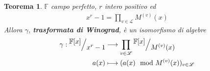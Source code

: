 \documentclass[mathserif]{beamer}
\def\quotient#1#2{%
   \raise1ex\hbox{$#1$}\Big/\lower1ex\hbox{$#2$}%
}
\newtheorem{teorema}{Teorema}
\begin{document}


\begin{frame}
      \begin{teorema}
        $\mathbb{F}$ campo perfetto, $r$ intero positivo ed
	\begin{align*}
	      x^r-1 = \prod_{v\in \mathscr{L}} M^{(v)}(x)
	\end{align*}
       Allora $\gamma$, {\bf trasformata di Winograd},  è un isomorfismo di algebre
	\begin{align*}
	\gamma :  \quotient{\mathbb{F} \lbrack x \rbrack  }{x^{r} - 1}
		  & \longrightarrow
		  \prod_{v\in \mathscr{L}} \quotient{\mathbb{F} \lbrack x \rbrack  }{M^{(v)}(x)}   \\
		  a(x) &\longmapsto  ( a(x)\mod{M^{(v)}(x)})_{v\in \mathscr{L}}
	\end{align*}
      \end{teorema}
\end{frame}
\end{document}
